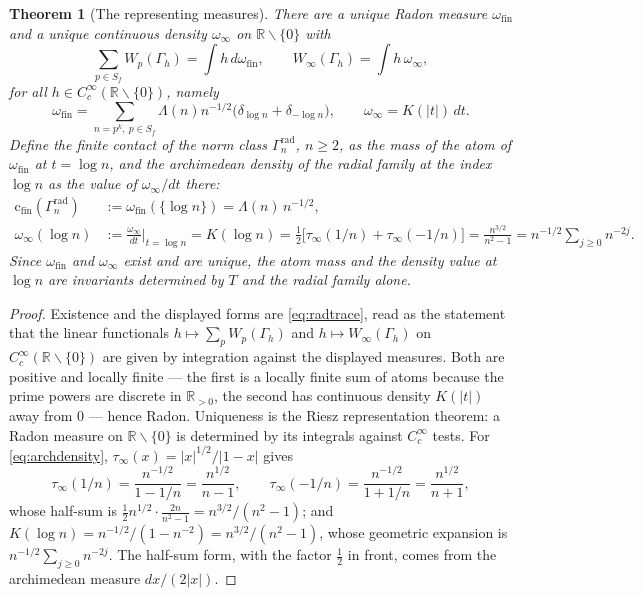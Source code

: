 \documentclass[11pt]{amsart}
\newtheorem{theorem}{Theorem}[section]
\theoremstyle{definition}
\theoremstyle{remark}
\newcommand{\R}{\mathbb R}
\newcommand{\cfin}{\mathrm{c}_{\mathrm{fin}}}
\begin{document}
\begin{theorem}[The representing measures]\label{thm:repmeasures}
There are a unique Radon measure $\omega_{\mathrm{fin}}$ and a unique
continuous density $\omega_\infty$ on $\R\smallsetminus\{0\}$ with
\[
  \sum_{p\in S_f}W_p(\Gamma_h)=\int h\,d\omega_{\mathrm{fin}},\qquad
  W_\infty(\Gamma_h)=\int h\,\omega_\infty,
\]
for all $h\in C_c^\infty(\R\smallsetminus\{0\})$, namely
\begin{equation}\label{eq:repmeasures}
  \omega_{\mathrm{fin}}=\sum_{n=p^k,\ p\in S_f}\Lambda(n)n^{-1/2}
    \bigl(\delta_{\log n}+\delta_{-\log n}\bigr),\qquad
  \omega_\infty=K(|t|)\,dt .
\end{equation}
Define the \emph{finite contact} of the norm class $\Gamma_n^{\mathrm{rad}}$,
$n\ge2$, as the mass of the atom of $\omega_{\mathrm{fin}}$ at $t=\log n$, and
the \emph{archimedean density of the radial family at the index $\log n$} as
the value of $\omega_\infty/dt$ there:
\begin{align}
  \cfin(\Gamma_n^{\mathrm{rad}})&:=\omega_{\mathrm{fin}}(\{\log n\})
     =\Lambda(n)\,n^{-1/2},\label{eq:radcontact}\\
  \omega_\infty(\log n)&:=\frac{\omega_\infty}{dt}\Big|_{t=\log n}
     =K(\log n)=\tfrac12\bigl[\tau_\infty(1/n)+\tau_\infty(-1/n)\bigr]
     =\frac{n^{3/2}}{n^2-1}=n^{-1/2}\sum_{j\ge0}n^{-2j}.\label{eq:archdensity}
\end{align}
Since $\omega_{\mathrm{fin}}$ and $\omega_\infty$ exist and are unique, the atom
mass and the density value at $\log n$ are invariants determined by $T$ and the
radial family alone.
\end{theorem}

\begin{proof}
Existence and the displayed forms are \eqref{eq:radtrace}, read as the statement
that the linear functionals $h\mapsto\sum_pW_p(\Gamma_h)$ and
$h\mapsto W_\infty(\Gamma_h)$ on $C_c^\infty(\R\smallsetminus\{0\})$ are given
by integration against the displayed measures. Both are positive and locally
finite --- the first is a locally finite sum of atoms because the prime powers
are discrete in $\R_{>0}$, the second has continuous density $K(|t|)$ away from
$0$ --- hence Radon. Uniqueness is the Riesz representation theorem: a Radon
measure on $\R\smallsetminus\{0\}$ is determined by its integrals against
$C_c^\infty$ tests. For \eqref{eq:archdensity},
$\tau_\infty(x)=|x|^{1/2}/|1-x|$ gives
\[
  \tau_\infty(1/n)=\frac{n^{-1/2}}{1-1/n}=\frac{n^{1/2}}{n-1},\qquad
  \tau_\infty(-1/n)=\frac{n^{-1/2}}{1+1/n}=\frac{n^{1/2}}{n+1},
\]
whose half-sum is $\tfrac12n^{1/2}\cdot\frac{2n}{n^2-1}=n^{3/2}/(n^2-1)$; and
$K(\log n)=n^{-1/2}/(1-n^{-2})=n^{3/2}/(n^2-1)$, whose geometric expansion is
$n^{-1/2}\sum_{j\ge0}n^{-2j}$. The half-sum form, with the factor $\tfrac12$
in front, comes from the archimedean measure $dx/(2|x|)$.
\end{proof}
\end{document}
